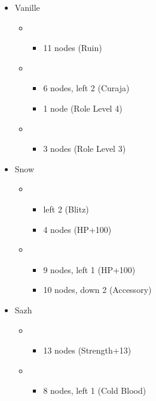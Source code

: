\begin{menu}
	\begin{itemize}
		\crystarium
		\begin{itemize}
			\item Vanille
				\begin{itemize}
					\item \com
						\begin{itemize}
							\item 11 nodes (Ruin)
						\end{itemize}
					\item \med
						\begin{itemize}
							\item 6 nodes, left 2 (Curaja)
							\item 1 node (Role Level 4)
						\end{itemize}
					\item \rav
						\begin{itemize}
							\item 3 nodes (Role Level 3)
						\end{itemize}	
				\end{itemize}
			\item Snow
				\begin{itemize}
					\item \com
						\begin{itemize}
							\item left 2 (Blitz)
							\item 4 nodes (HP+100)
						\end{itemize}
					\item \rav
						\begin{itemize}
							\item 9 nodes, left 1 (HP+100)
							\item 10 nodes, down 2 (Accessory)
						\end{itemize}
				\end{itemize}
			\item Sazh
				\begin{itemize}
					\item \com
						\begin{itemize}
							\item 13 nodes (Strength+13)
						\end{itemize}
					\item \rav
						\begin{itemize}
							\item 8 nodes, left 1 (Cold Blood)
						\end{itemize}

\end{itemize}
\end{itemize}
\end{itemize}
\end{menu}
